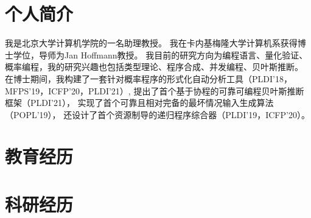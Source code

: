 \documentclass[11pt,letterpaper,roman]{moderncv}        %
\begin{document}
\makecvtitle


\section{个人简介}

我是北京大学计算机学院的一名助理教授。 
我在卡内基梅隆大学计算机系获得博士学位，导师为Jan Hoffmann教授。 
我目前的研究方向为编程语言、量化验证、概率编程，我的研究兴趣也包括类型理论、程序合成、并发编程、贝叶斯推断。
%
在博士期间，我构建了一套针对概率程序的形式化自动分析工具（PLDI'18，MFPS'19，ICFP'20，PLDI'21）,
提出了首个基于协程的可靠可编程贝叶斯推断框架（PLDI'21），
实现了首个可靠且相对完备的最坏情况输入生成算法（POPL'19），
还设计了首个资源制导的递归程序综合器（PLDI'19，ICFP'20）。

\section{教育经历}

  {}

  \vspace{4pt}

  {}

\section{科研经历}

\end{document}
